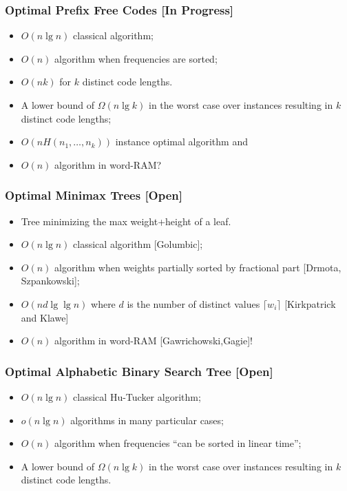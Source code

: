 \documentclass{beamer}
\begin{document}
\begin{frame}
  \frametitle{Optimal Prefix Free Codes [In Progress]}
  \begin{itemize}
  \item $O(n\lg n)$ classical algorithm; 
  \item $O(n)$ algorithm when frequencies are sorted;
  \item $O(nk)$ for $k$ distinct code lengths.
  \item A lower bound of $\Omega(n\lg k)$ in the worst case over
    instances resulting in $k$ distinct code lengths;
  \item $O(nH(n_1,\ldots,n_k))$ instance optimal algorithm and 
  \item $O(n)$ algorithm in word-RAM?
  \end{itemize}
\end{frame}

\begin{frame}
  \frametitle{Optimal Minimax Trees [Open]}
  \begin{itemize}
  \item Tree minimizing the max weight+height of a leaf.
  \item $O(n\lg n)$ classical algorithm [Golumbic];
  \item $O(n)$ algorithm when weights partially sorted by fractional part [Drmota, Szpankowski];
  \item $O(nd\lg\lg n)$ where $d$ is the number of distinct values
    $\lceil w_i\rceil$ [Kirkpatrick and Klawe]
  \item $O(n)$ algorithm in word-RAM [Gawrichowski,Gagie]!
  \end{itemize}
\end{frame}

\begin{frame}
  \frametitle{Optimal Alphabetic Binary Search Tree [Open]}
  \begin{itemize}
  \item $O(n\lg n)$ classical Hu-Tucker algorithm;
  \item $o(n\lg n)$ algorithms in many particular cases;
  \item $O(n)$ algorithm when frequencies ``can be sorted in linear time'';
  \item A lower bound of $\Omega(n\lg k)$ in the worst case over
    instances resulting in $k$ distinct code lengths.
  \end{itemize}
\end{frame}
\end{document}
